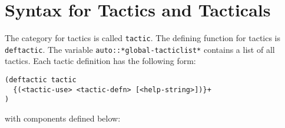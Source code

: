 \section{Syntax for Tactics and Tacticals}

The \TPS category for tactics is called {\tt tactic}.  The defining 
function for tactics is {\tt deftactic}. The variable {\tt auto::*global-tacticlist*}
contains a list of all tactics. Each tactic definition has
the following form:

\begin{verbatim}
(deftactic tactic
  {(<tactic-use> <tactic-defn> [<help-string>])}+
)
\end{verbatim}

with components defined below:

